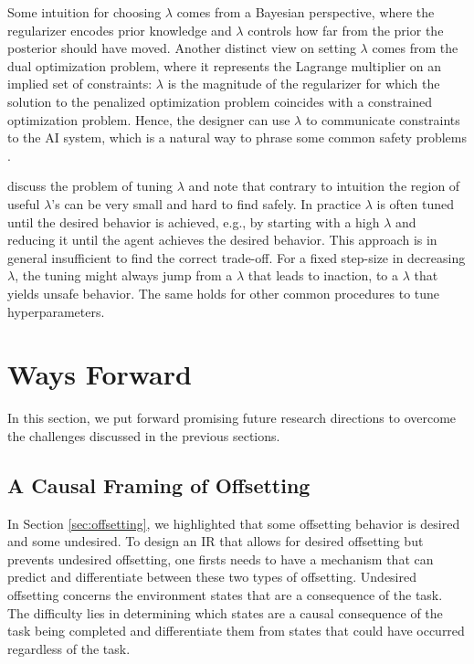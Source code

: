 \documentclass[letterpaper]{article} %
\begin{document}
Some intuition for choosing $\lambda$ comes from a Bayesian perspective, where the regularizer encodes prior knowledge and $\lambda$ controls how far from the prior the posterior should have moved. Another distinct view on setting $\lambda$ comes from the dual optimization problem, where it represents the Lagrange multiplier on an implied set of constraints: $\lambda$ is the magnitude of the regularizer for which the solution to the penalized optimization problem coincides with a constrained optimization problem. Hence, the designer can use $\lambda$ to communicate constraints to the AI system, which is a natural way to phrase some common safety problems \citep{ray2019benchmarking}.

\citet{armstrong2017low} discuss the problem of tuning $\lambda$ and note that contrary to intuition the region of useful $\lambda$'s can be very small and hard to find safely.
In practice $\lambda$ is often tuned until the desired behavior is achieved, e.g., by starting with a high $\lambda$ and reducing it until the agent achieves the desired behavior. This approach is in general insufficient to find the correct trade-off. For a fixed step-size in decreasing $\lambda$, the tuning might always jump from a $\lambda$ that leads to inaction, to a $\lambda$ that yields unsafe behavior. The same holds for other common procedures to tune hyperparameters.

\section{Ways Forward}
\label{sec:alternatives}
In this section, we put forward promising future research directions to overcome the challenges discussed in the previous sections.

\subsection{A Causal Framing of Offsetting} \label{sec:causal_offsetting}
In Section \ref{sec:offsetting}, we highlighted that some offsetting behavior is desired and some undesired. To design an IR that allows for desired offsetting but prevents undesired offsetting, one firsts needs to have a mechanism that can predict and differentiate between these two types of offsetting. Undesired offsetting concerns the environment states that are a consequence of the task. The difficulty lies in determining which states are a causal consequence of the task being completed and differentiate them from states that could have occurred regardless of the task. 
\end{document}
